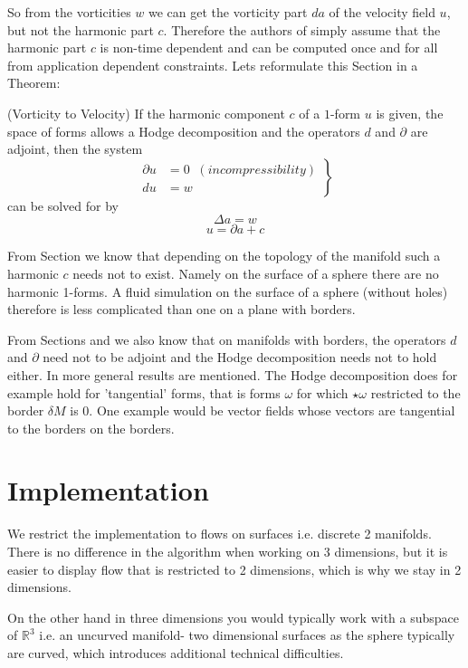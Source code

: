 So from the vorticities $w$ we can get the vorticity part $da$ of the velocity field $u$, but not the harmonic part $c$. Therefore the authors of \note{[...]} simply assume that the harmonic part $c$ is non-time dependent and can be computed once and for all from application dependent constraints. Lets reformulate this Section in a Theorem:

\begin{thm}(Vorticity to Velocity) If the harmonic component $c$ of a $1$-form $u$ is given, the space of forms allows a Hodge decomposition and the operators $d$ and $\partial$ are adjoint, then the system
\begin{equation}\left.\begin{aligned}\partial u &= 0 \;\; (incompressibility) \\ 
du &= w \end{aligned}\right\}\end{equation}
can be solved for by
\[\Delta a = w\]
\[u = \partial a + c\]
\end{thm}

From Section  we know that depending on the topology of the manifold such a harmonic $c$ needs not to exist. Namely on the surface of a sphere there are no harmonic 1-forms. A fluid simulation on the surface of a sphere (without holes) therefore is less complicated than one on a plane with borders. 

From Sections  and  we also know that on manifolds with borders, the operators $d$ and $\partial$ need not to be adjoint and the Hodge decomposition needs not to hold either. In  more general results are mentioned. The Hodge decomposition does for example hold for 'tangential' forms, that is forms $\omega$ for which $\star\omega$ restricted to the border $\delta M$ is 0. One example would be vector fields whose vectors are tangential to the borders on the borders. 

\section{Implementation}
We restrict the implementation to flows on surfaces i.e. discrete 2 manifolds. There is no difference in the algorithm when working on 3 dimensions, but it is easier to display flow that is restricted to 2 dimensions, which is why we stay in 2 dimensions. 

On the other hand in three dimensions you would typically work with a subspace of $\mathbb R^3$ i.e. an uncurved manifold- two dimensional surfaces as the sphere typically are curved, which introduces additional technical difficulties.

